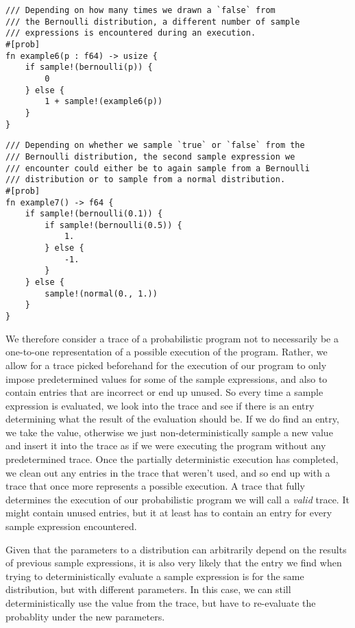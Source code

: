\begin{minipage}{\linewidth}
\begin{lstlisting}
/// Depending on how many times we drawn a `false` from
/// the Bernoulli distribution, a different number of sample
/// expressions is encountered during an execution.
#[prob]
fn example6(p : f64) -> usize {
    if sample!(bernoulli(p)) {
        0
    } else {
        1 + sample!(example6(p))
    }
}
\end{lstlisting}
\end{minipage}


\begin{minipage}{\linewidth}
\begin{lstlisting}
/// Depending on whether we sample `true` or `false` from the
/// Bernoulli distribution, the second sample expression we
/// encounter could either be to again sample from a Bernoulli
/// distribution or to sample from a normal distribution. 
#[prob]
fn example7() -> f64 {
    if sample!(bernoulli(0.1)) {
        if sample!(bernoulli(0.5)) {
            1.
        } else {
            -1.
        }
    } else {
        sample!(normal(0., 1.))
    }
}
\end{lstlisting}
\end{minipage}

We therefore consider a trace of a probabilistic program not to necessarily be a one-to-one representation of a possible execution of the program. Rather, we allow for a trace picked beforehand for the execution of our program to only impose predetermined values for some of the sample expressions, and also to contain entries that are incorrect or end up unused. So every time a sample expression is evaluated, we look into the trace and see if there is an entry determining what the result of the evaluation should be. If we do find an entry, we take the value, otherwise we just non-deterministically sample a new value and insert it into the trace as if we were executing the program without any predetermined trace. Once the partially deterministic execution has completed, we clean out any entries in the trace that weren't used, and so end up with a trace that once more represents a possible execution. A trace that fully determines the execution of our probabilistic program we will call a \textit{valid} trace. It might contain unused entries, but it at least has to contain an entry for every sample expression encountered.

Given that the parameters to a distribution can arbitrarily depend on the results of previous sample expressions, it is also very likely that the entry we find when trying to deterministically evaluate a sample expression is for the same distribution, but with different parameters. In this case, we can still deterministically use the value from the trace, but have to re-evaluate the probablity under the new parameters.

